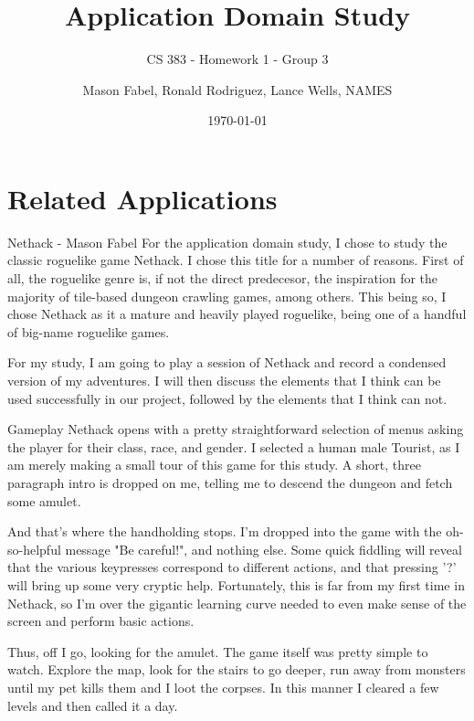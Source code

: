 \documentclass[12pt]{report}
\title{Application Domain Study}
\subtitle{CS 383 - Homework 1 - Group 3}
\author{Mason Fabel, Ronald Rodriguez, Lance Wells, NAMES} %
\date{\today}
\begin{document}
\maketitle

\chapter{Related Applications}


\begin{section}{Nethack - Mason Fabel}
For the application domain study, I chose to study the classic roguelike
game Nethack. I chose this title for a number of reasons. First of all,
the roguelike genre is, if not the direct predecesor, the inspiration for
the majority of tile-based dungeon crawling games, among others. This being
so, I chose Nethack as it a mature and heavily played roguelike, being one
of a handful of big-name roguelike games.

For my study, I am going to play a session of Nethack and record a
condensed version of my adventures. I will then discuss the elements that
I think can be used successfully in our project, followed by the elements
that I think can not.

\begin{subsection}{Gameplay}
Nethack opens with a pretty straightforward selection of menus asking the
player for their class, race, and gender. I selected a human male Tourist,
as I am merely making a small tour of this game for this study. A short,
three paragraph intro is dropped on me, telling me to descend the
dungeon and fetch some amulet.

And that's where the handholding stops. I'm dropped into the game with the
oh-so-helpful message "Be careful!", and nothing else. Some quick fiddling
will reveal that the various keypresses correspond to different actions,
and that pressing '?' will bring up some very cryptic help. Fortunately,
this is far from my first time in Nethack, so I'm over the gigantic
learning curve needed to even make sense of the screen and perform basic
actions.

Thus, off I go, looking for the amulet. The game itself was pretty simple
to watch. Explore the map, look for the stairs to go deeper, run away from
monsters until my pet kills them and I loot the corpses. In this manner I
cleared a few levels and then called it a day.
\end{subsection}


\end{section}
\end{document}
